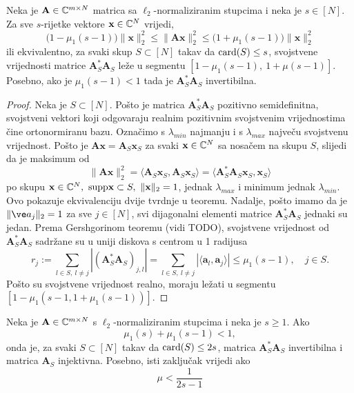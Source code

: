 \documentclass[a4paper,twoside,12pt]{memoir} %
\newcommand{\vect}[1]{\mathbf{#1}}
\renewcommand{\vec}{\vect}
\newcommand{\card}{\text{\normalfont{card}}}
\newcommand{\supp}{\text{\normalfont{supp}}}
\newcommand{\norm}[1]{\|{#1}\|}
\begin{document}
\begin{thm}
    Neka je $\vec A \in \C^{m \times N}$ matrica sa $\ell_2$-normaliziranim stupcima i neka je $s \in [N]$. Za sve $s$-rijetke vektore $\vec x \in \C^N$ vrijedi,
    \begin{equation*}
        \big(1-\mu_1(s-1)\big) \norm{\vec x}_2^2 \leq \norm{\vec{Ax}}_2^2 \leq \big(1+\mu_1(s-1)\big) \norm{\vec x}_2^2
    \end{equation*}
    ili ekvivalentno, za svaki skup $S \subset [N]$ takav da $\card(S) \leq s$, svojstvene vrijednosti matrice $\vec A^*_S \vec A_S$ le\v{z}e u segmentu $[1-\mu_1(s-1),\ 1+\mu(s-1)]$. Posebno, ako je $\mu_1(s-1) < 1$ tada je $\vec A^*_S \vec A_S$ invertibilna.
\end{thm}
\begin{proof}
    Neka je $S \subset [N]$. Po\v{s}to je matrica $\vec A^*_S \vec A_S$ pozitivno semidefinitna, svojstveni vektori koji odgovaraju realnim pozitivnim svojstvenim vrijednostima \v{c}ine ortonormiranu bazu. Ozna\v{c}imo s $\lambda_{min}$ najmanju i s $\lambda_{max}$ najve\v{c}u svojstvenu vrijednost. Po\v{s}to je $\vec{Ax} = \vec A_S \vec x_S$ za svaki $\vec x \in \C^N$ sa nosa\v{c}em na skupu $S$, slijedi da je maksimum od
    \begin{equation*}
        \norm{\vec{Ax}}_2^2 = \langle \vec A_S \vec x_S, \vec A_S \vec x_S  \rangle = \langle \vec A^*_S \vec A_S \vec x_S, \vec x_S \rangle
    \end{equation*}
    po skupu ${\vec x \in \C^N,\ \supp \vec x \subset S,\ \norm{\vec x}_2 = 1}$, jednak $\lambda_{max}$ i minimum jednak $\lambda_{min}$. Ovo pokazuje ekvivalenciju dvije tvrdnje u teoremu. Nadalje, po\v{s}to imamo da je $\norm{\ve a_j}_2 = 1$ za sve $j \in [N]$, svi dijagonalni elementi matrice $\vec A^*_S \vec A_S$ jednaki su jedan. Prema Gershgorinom teoremu (vidi TODO), svojstvene vrijednost od $\vec A^*_S \vec A_S$ sadr\v{z}ane su u uniji diskova s centrom u 1 radijusa
    \begin{equation*}
        r_j := \sum_{l \in S,\ l \neq j} |(\vec A^*_S \vec A_S)_{j,l}| = \sum_{l \in S,\ l \neq j} |\langle \vec a_l, \vec a_j \rangle| \leq \mu_1 (s-1),\quad j \in S.
    \end{equation*}
    \newpage
    Po\v{s}to su svojstvene vrijednost realno, moraju le\v{z}ati u segmentu $[1-\mu_1(s-1, 1+ \mu_1(s-1))]$.
\end{proof}
\begin{cor}
    Neka je $\vec A \in \C^{m \times N}$ s $\ell_2$-normaliziranim stupcima i neka je $s \geq 1$. Ako  
    \begin{equation*}
        \mu_1(s) + \mu_1(s-1) < 1, 
    \end{equation*}
    onda je, za svaki $S \subset [N]$ takav da $\card(S) \leq 2s$, matrica $\vec A^*_S \vec A_S$ invertibilna i matrica $\vec A_S$ injektivna. Posebno, isti zaklju\v{c}ak vrijedi ako
    \begin{equation*}
        \mu < \frac{1}{2s - 1}  
    \end{equation*}
\end{cor}
\end{document}
